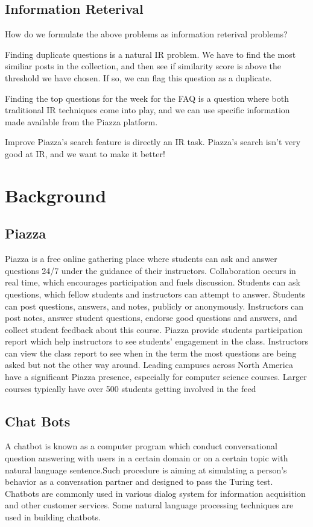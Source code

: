 \documentclass[sigconf]{acmart}
\begin{document}
\subsection{Information Reterival}
How do we formulate the above problems as information reterival problems?

Finding duplicate questions is a natural IR problem. We have to find the most similiar posts in the collection, and then see if similarity score is above the threshold we have chosen. If so, we can flag this question as a duplicate.

Finding the top questions for the week for the FAQ is a question where both traditional IR techniques come into play, and we can use specific information made available from the Piazza platform.

Improve Piazza's search feature is directly an IR task. Piazza's search isn't very good at IR, and we want to make it better!


\section{Background}

\subsection{Piazza}
Piazza is a free online gathering place where students can ask and answer questions 24/7 under the guidance of their instructors. Collaboration occurs in real time, which encourages participation and fuels discussion. Students can ask questions, which fellow students and instructors can attempt to answer. Students can post questions, answers, and notes, publicly or anonymously. Instructors can post notes, answer student questions, endorse good questions and answers, and collect student feedback about this course. Piazza provide students participation report which help instructors to see students’ engagement in the class. Instructors can view the class report to see when in the term the most questions are being asked but not the other way around. Leading campuses across North America have a significant Piazza presence, especially for computer science courses. Larger courses typically have over 500 students getting involved in the feed

\subsection{Chat Bots}A chatbot is known as a computer program which conduct conversational question answering  with users in a certain domain or on a certain topic with natural language sentence.Such procedure is aiming at simulating a person’s behavior as a conversation partner and designed to pass the Turing test. Chatbots are commonly used in various dialog system for information acquisition and other customer services. Some natural language processing techniques are used in building chatbots.
\end{document}
